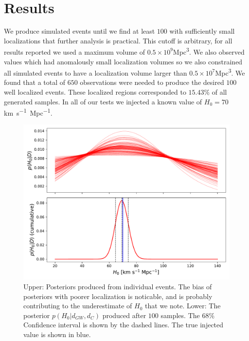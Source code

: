 \section{Results} \label{sec:conclusions}
We produce simulated events until we find at least $100$ with sufficiently small localizations that further analysis is practical.
This cutoff is arbitrary, for all results reported we used a maximum volume of $0.5\times 10^{9}$\si{Mpc^3}.
We also observed values which had anomalously small localization volumes so we also constrained all simulated events to have a localization volume larger than $0.5\times 10^{7}$\si{Mpc^3}.
We found that a total of $650$ observations were needed to produce the desired $100$ well localized events.
These localized regions corresponded to $15.43\%$ of all generated samples.
In all of our tests we injected a known value of $H_0=70$\si{km.s^{-1}.Mpc^{-1}}.

\begin{figure}[t]
    \centering
    \includegraphics[width=\columnwidth]{figures/posterior.pdf}
    \caption{Upper: Posteriors produced from individual events. The bias of posteriors with poorer localization is noticable, and is probably contributing to the underestimate of $H_0$ that we note. Lower: The posterior $p(H_0 | d_{GW}, d_C)$ produced after $100$ samples. The $68\%$ Confidence interval is shown by the dashed lines. The true injected value is shown in blue.}
    \label{fig:posterior}
\end{figure}

